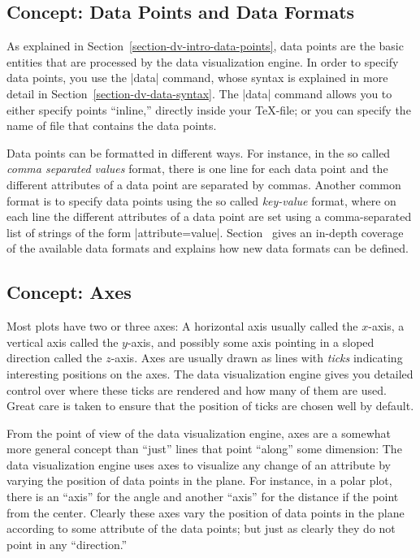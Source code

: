 \subsection{Concept: Data Points and Data Formats}

As explained in Section~\ref{section-dv-intro-data-points}, data
points are the basic entities that are processed by the data
visualization engine. In order to specify data points, you use the
|data| command, whose syntax is explained in more detail in
Section~\ref{section-dv-data-syntax}. The |data| command allows you to
either specify points ``inline,'' directly inside your \TeX-file; or
you can specify the name of file that contains the data points.

Data points can be formatted in different ways. For instance, in the so
called \emph{comma separated values} format, there is one line for
each data point and the different attributes of a data point are
separated by commas. Another common format is to specify data points
using the so called \emph{key-value} format, where on each line the
different attributes of a data point are set using a comma-separated
list of strings of the form
|attribute=value|. Section~\label{section-dv-formats} gives an
in-depth coverage of the available data formats and explains how new
data formats can be defined.



\subsection{Concept: Axes}

Most plots have two or three axes: A horizontal axis usually called
the $x$-axis, a vertical axis called the $y$-axis, and possibly some 
axis pointing in a sloped direction called the $z$-axis. Axes are
usually drawn as lines with \emph{ticks} indicating interesting
positions on the axes. The data visualization engine gives you
detailed control over where these ticks are rendered and how many of
them are used. Great care is taken to ensure that the position of
ticks are chosen well by default.

From the point of view of the data visualization engine, axes are a
somewhat more general concept than ``just'' lines that point ``along''
some dimension: The data visualization engine uses axes to visualize
any change of an attribute by varying the position of data points in the
plane. For instance, in a polar plot, there is an ``axis'' for the
angle and another ``axis'' for the distance if the point from the
center. Clearly these axes vary the position of data points in the
plane according to some attribute of the data points; but just as
clearly they do not point in any ``direction.''


